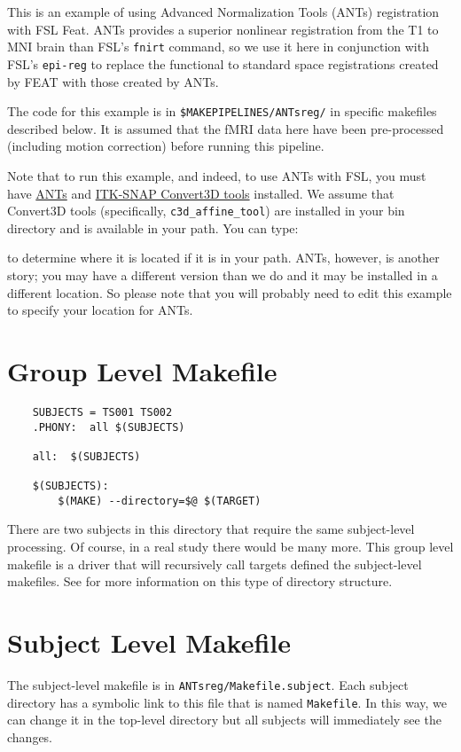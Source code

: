 \label{section:antsreg}

This is an example of using Advanced Normalization Tools (ANTs)\citep{ants}
registration with FSL Feat. ANTs provides a superior nonlinear
registration from the T1 to MNI brain than FSL's \texttt{fnirt}
command, so we use it here in conjunction with FSL's \texttt{epi-reg}
to replace the functional to standard space registrations created by
FEAT with those created by ANTs. 

The code for this example is in
\texttt{\$MAKEPIPELINES/ANTsreg/} in specific makefiles described
below. It is assumed that the fMRI data here have been pre-processed
(including motion correction) before running this pipeline. 

Note that to run this example, and indeed, to use ANTs with FSL, you
must have \href{http://stnava.github.io/ANTs/}{ANTs} and
\href{http://www.itksnap.org/pmwiki/pmwiki.php?n=Convert3D.Documentation}{ITK-SNAP
  Convert3D tools} installed. We assume that Convert3D tools
(specifically, \texttt{c3d_affine_tool}) are installed in your bin
directory and is available in your path. You can type:

to determine where it is located if it is in your path.
ANTs, however, is another story; you may have a different
version than we do and it may be installed in a different location. So
please note that you will probably need to edit this example to
specify your location for ANTs.

\section{Group Level Makefile}
\begin{lstlisting}
	SUBJECTS = TS001 TS002 
	.PHONY:  all $(SUBJECTS)

	all:  $(SUBJECTS)

	$(SUBJECTS): 
		$(MAKE) --directory=$@ $(TARGET)
\end{lstlisting}

There are two subjects in this directory that require the same
subject-level processing. Of course, in a real study there would be
many more. This group level makefile is a driver that will
recursively call targets defined the subject-level makefiles. See
 for more information on this type of
directory structure.

\section{Subject Level Makefile}
The subject-level makefile is in
\texttt{ANTsreg/Makefile.subject}. Each subject directory has a
symbolic link to this file that is named \texttt{Makefile}. In this
way, we can change it in the top-level directory but all subjects will
immediately see the changes.


